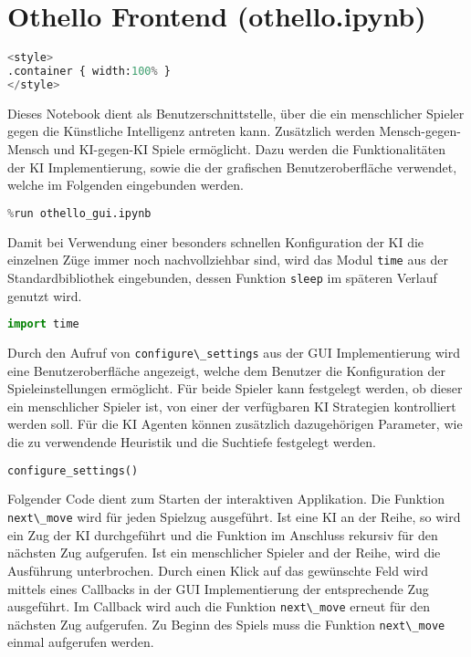 \hypertarget{othello-frontend-othello.ipynb}{%
\section{Othello Frontend
(othello.ipynb)}\label{othello-frontend-othello.ipynb}}

\label{sec:frontend}

\begin{lstlisting}[language=Python]
%%HTML
<style>
.container { width:100% }
</style>
\end{lstlisting}

Dieses Notebook dient als Benutzerschnittstelle, über die ein
menschlicher Spieler gegen die Künstliche Intelligenz antreten kann.
Zusätzlich werden Mensch-gegen-Mensch und KI-gegen-KI Spiele ermöglicht.
Dazu werden die Funktionalitäten der KI Implementierung, sowie die der
grafischen Benutzeroberfläche verwendet, welche im Folgenden eingebunden
werden.

\begin{lstlisting}[language=Python]
%run othello_ai.ipynb
%run othello_gui.ipynb
\end{lstlisting}

Damit bei Verwendung einer besonders schnellen Konfiguration der KI die
einzelnen Züge immer noch nachvollziehbar sind, wird das Modul
\passthrough{\lstinline!time!} aus der Standardbibliothek eingebunden,
dessen Funktion \passthrough{\lstinline!sleep!} im späteren Verlauf
genutzt wird.

\begin{lstlisting}[language=Python]
import time
\end{lstlisting}

Durch den Aufruf von \passthrough{\lstinline!configure\_settings!} aus
der GUI Implementierung wird eine Benutzeroberfläche angezeigt, welche
dem Benutzer die Konfiguration der Spieleinstellungen ermöglicht. Für
beide Spieler kann festgelegt werden, ob dieser ein menschlicher Spieler
ist, von einer der verfügbaren KI Strategien kontrolliert werden soll.
Für die KI Agenten können zusätzlich dazugehörigen Parameter, wie die zu
verwendende Heuristik und die Suchtiefe festgelegt werden.

\begin{lstlisting}[language=Python]
configure_settings()
\end{lstlisting}

Folgender Code dient zum Starten der interaktiven Applikation. Die
Funktion \passthrough{\lstinline!next\_move!} wird für jeden Spielzug
ausgeführt. Ist eine KI an der Reihe, so wird ein Zug der KI
durchgeführt und die Funktion im Anschluss rekursiv für den nächsten Zug
aufgerufen. Ist ein menschlicher Spieler and der Reihe, wird die
Ausführung unterbrochen. Durch einen Klick auf das gewünschte Feld wird
mittels eines Callbacks in der GUI Implementierung der entsprechende Zug
ausgeführt. Im Callback wird auch die Funktion
\passthrough{\lstinline!next\_move!} erneut für den nächsten Zug
aufgerufen. Zu Beginn des Spiels muss die Funktion
\passthrough{\lstinline!next\_move!} einmal aufgerufen werden.

